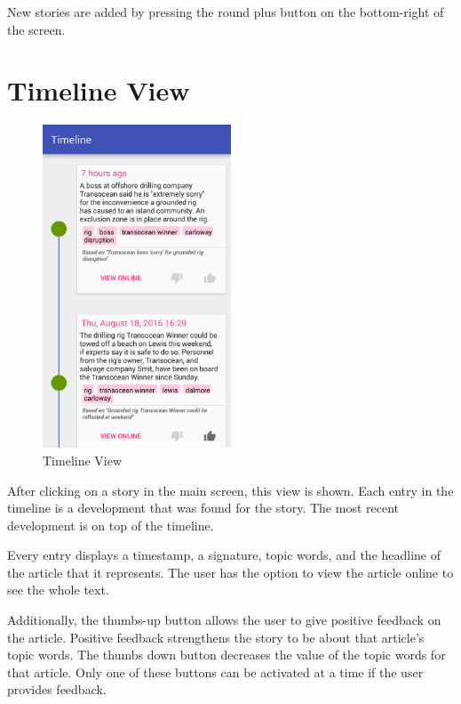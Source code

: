 \documentclass[11pt,titlepage]{report}
\begin{document}
New stories are added by pressing the round plus button on the bottom-right of the screen.
\newpage
\section{Timeline View}
\begin{figure}
	\vspace{-1cm}
	\begin{center}
		\includegraphics[width=0.5\textwidth]{img/timeline.png}
	\end{center}
	\caption{Timeline View}
	\vspace{-7.5cm}
\end{figure}
After clicking on a story in the main screen, this view is shown. Each entry in the timeline is a development that was found for the story. The most recent development is on top of the timeline.

Every entry displays a timestamp, a signature, topic words, and the headline of the article that it represents. The user has the option to view the article online to see the whole text.

Additionally, the thumbs-up button allows the user to give positive feedback on the article. Positive feedback strengthens the story to be about that article's topic words. The thumbs down button decreases the value of the topic words for that article. Only one of these buttons can be activated at a time if the user provides feedback.
\newpage
\end{document}

